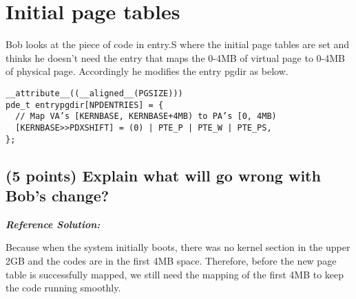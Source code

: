 \documentclass[]{article}
\begin{document}
\hypertarget{initial-page-tables}{%
\section{Initial page tables}\label{initial-page-tables}}

Bob looks at the piece of code in entry.S where the initial page tables
are set and thinks he doesn't need the entry that maps the 0-4MB of
virtual page to 0-4MB of physical page. Accordingly he modifies the
entry pgdir as below.

\begin{verbatim}
__attribute__((__aligned__(PGSIZE)))
pde_t entrypgdir[NPDENTRIES] = {
  // Map VA’s [KERNBASE, KERNBASE+4MB) to PA’s [0, 4MB)
  [KERNBASE>>PDXSHIFT] = (0) | PTE_P | PTE_W | PTE_PS,
};
\end{verbatim}

\hypertarget{points-explain-what-will-go-wrong-with-bobs-change}{%
\subsection{(5 points) Explain what will go wrong with Bob's
change?}\label{points-explain-what-will-go-wrong-with-bobs-change}}

\textbf{\emph{Reference Solution:}}

Because when the system initially boots, there was no kernel section in
the upper 2GB and the codes are in the first 4MB space. Therefore,
before the new page table is successfully mapped, we still need the
mapping of the first 4MB to keep the code running smoothly.
\end{document}
